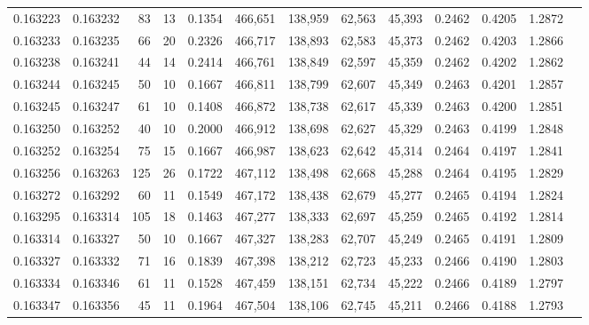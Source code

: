\begin{tabular}{rrrrrrrrrrrrr}
0.163223 & 0.163232 &    83 &  13 &                                     0.1354 & 466,651 & 138,959 &  62,563 &  45,393 & 0.2462 & 0.4205 & 1.2872 \\
0.163233 & 0.163235 &    66 &  20 &                                     0.2326 & 466,717 & 138,893 &  62,583 &  45,373 & 0.2462 & 0.4203 & 1.2866 \\
0.163238 & 0.163241 &    44 &  14 &                                     0.2414 & 466,761 & 138,849 &  62,597 &  45,359 & 0.2462 & 0.4202 & 1.2862 \\
0.163244 & 0.163245 &    50 &  10 &                                     0.1667 & 466,811 & 138,799 &  62,607 &  45,349 & 0.2463 & 0.4201 & 1.2857 \\
0.163245 & 0.163247 &    61 &  10 &                                     0.1408 & 466,872 & 138,738 &  62,617 &  45,339 & 0.2463 & 0.4200 & 1.2851 \\
0.163250 & 0.163252 &    40 &  10 &                                     0.2000 & 466,912 & 138,698 &  62,627 &  45,329 & 0.2463 & 0.4199 & 1.2848 \\
0.163252 & 0.163254 &    75 &  15 &                                     0.1667 & 466,987 & 138,623 &  62,642 &  45,314 & 0.2464 & 0.4197 & 1.2841 \\
0.163256 & 0.163263 &   125 &  26 &                                     0.1722 & 467,112 & 138,498 &  62,668 &  45,288 & 0.2464 & 0.4195 & 1.2829 \\
0.163272 & 0.163292 &    60 &  11 &                                     0.1549 & 467,172 & 138,438 &  62,679 &  45,277 & 0.2465 & 0.4194 & 1.2824 \\
0.163295 & 0.163314 &   105 &  18 &                                     0.1463 & 467,277 & 138,333 &  62,697 &  45,259 & 0.2465 & 0.4192 & 1.2814 \\
0.163314 & 0.163327 &    50 &  10 &                                     0.1667 & 467,327 & 138,283 &  62,707 &  45,249 & 0.2465 & 0.4191 & 1.2809 \\
0.163327 & 0.163332 &    71 &  16 &                                     0.1839 & 467,398 & 138,212 &  62,723 &  45,233 & 0.2466 & 0.4190 & 1.2803 \\
0.163334 & 0.163346 &    61 &  11 &                                     0.1528 & 467,459 & 138,151 &  62,734 &  45,222 & 0.2466 & 0.4189 & 1.2797 \\
0.163347 & 0.163356 &    45 &  11 &                                     0.1964 & 467,504 & 138,106 &  62,745 &  45,211 & 0.2466 & 0.4188 & 1.2793 \\

\end{tabular}
